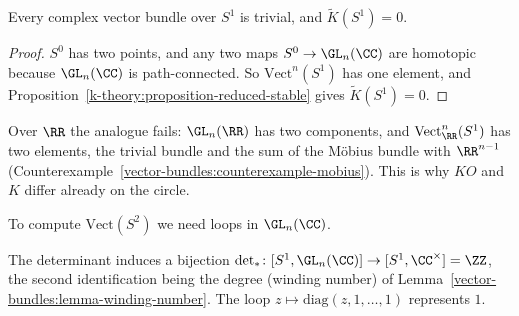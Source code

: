 \begin{corollary}\label{k-theory:corollary-circle}
Every complex vector bundle over $S^1$ is trivial, and $\tilde{K}(S^1) = 0$.
\end{corollary}

\begin{proof}
$S^0$ has two points, and any two maps $S^0 \to \GL_n(\CC)$ are homotopic because $\GL_n(\CC)$ is path-connected. So $\mathrm{Vect}^n(S^1)$ has one element, and
Proposition~\ref{k-theory:proposition-reduced-stable} gives $\tilde{K}(S^1) = 0$.
\end{proof}

\begin{remark}\label{k-theory:remark-real-circle}
Over $\RR$ the analogue fails: $\GL_n(\RR)$ has two components, and $\mathrm{Vect}^n_\RR(S^1)$ has two elements, the trivial bundle and the sum of the M\"obius bundle with $\RR^{n-1}$
(Counterexample~\ref{vector-bundles:counterexample-mobius}). This is why $KO$ and $K$ differ already on the circle.
\end{remark}

To compute $\mathrm{Vect}(S^2)$ we need loops in $\GL_n(\CC)$.

\begin{proposition}\label{k-theory:proposition-pi-one-gl}
The determinant induces a bijection $\det_* \colon [S^1, \GL_n(\CC)] \to [S^1, \CC^\times] = \ZZ$, the second identification being the degree (winding number) of Lemma~\ref{vector-bundles:lemma-winding-number}.
The loop $z \mapsto \mathrm{diag}(z, 1, \ldots, 1)$ represents $1$.
\end{proposition}

